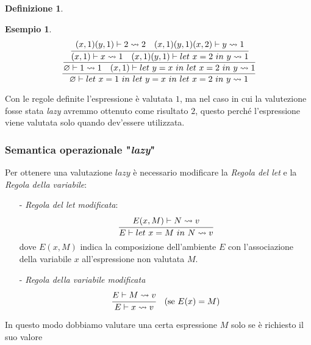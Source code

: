 \documentclass{article}
\theoremstyle{definition}
\theoremstyle{definition}
\theoremstyle{definition}
\newtheorem{definition}[theorem]{Definizione}
\newtheorem{example}[theorem]{Esempio}
\theoremstyle{remark}
\begin{document}
\begin{definition}
\begin{example}
        $$\cfrac{\cfrac{\cfrac{(x,1)(y,1)\vdash 2\leadsto 2 \quad (x,1)(y,1)(x,2)\vdash y\leadsto 1}{(x,1)\vdash x \leadsto 1 \quad (x,1)(y,1)\vdash\text{$let$ $x=2$ $in$ $y\leadsto 1$}}}{\varnothing \vdash 1\leadsto 1\quad (x,1)\vdash\text{$let$ $y=x$ $in$ $let$ $x=2$ $in$ $y\leadsto 1$}}}{\varnothing\vdash \text{$let$ $x=1$ $in$ $let$ $y=x$ $in$ $let$ $x=2$ $in$ $y\leadsto 1$}}$$

        Con le regole definite l'espressione è valutata $1$, ma nel caso in cui la valutezione fosse stata \textit{lazy} avremmo ottenuto come risultato $2$,
        questo perché l'espressione viene valutata solo quando dev'essere utilizzata.
    \end{example}
    \subsubsection{Semantica operazionale "\textit{\textbf{lazy}}"}
    Per ottenere una valutazione $lazy$ è necessario modificare la \textit{Regola del let} e la \textit{Regola della variabile}:
    \begin{itemize}
        \item [-] \textit{Regola del let modificata}: $$\cfrac{E(x,M)\vdash N \leadsto v}{E\vdash \text{$let$ $x=M$ $in$ $N\leadsto v$}}$$
              dove $E(x,M)$ indica la composizione dell'ambiente $E$ con l'associazione della variabile $x$ all'espressione non valutata $M$.
        \item [-] \textit{Regola della variabile modificata} $$\cfrac{E\vdash M\leadsto v}{E \vdash x \leadsto v}\quad (\text{se $E(x) = M$} )$$
    \end{itemize}
    In questo modo dobbiamo valutare una certa espressione $M$ solo se è richiesto il suo valore
\end{definition}
\end{document}
